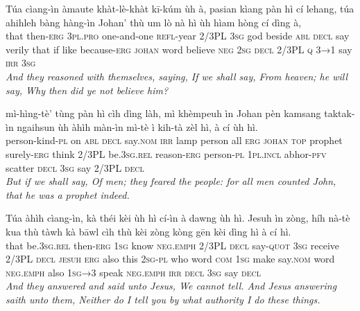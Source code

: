 \documentclass[11pt,a4paper]{article}
\begin{document}
\begin{exe}
\gll Túa cìang-ìn àmaute khàt-lè-khàt kī-kúm ùh à, pasian kìang pàn hì cí lehang, túa ahihleh bàng hàng-ìn Johan' thù um lò nà hì ùh hìam hòng cí dìng à, \\
     that then-\textsc{erg} \textsc{3pl}.\textsc{pro} one-and-one \textsc{refl}-year 2/3PL \textsc{3sg} god beside \textsc{abl} \textsc{decl} say verily that if like because-\textsc{erg} \textsc{johan} word believe \textsc{neg} \textsc{2sg} \textsc{decl} 2/3PL \textsc{q} \textsc{3→1} say \textsc{irr} \textsc{3sg} \\
\glt \textcolor{kjvcolor}{\textit{And they reasoned with themselves, saying, If we shall say, From heaven; he will say, Why then did ye not believe him?}}

\gll mì-hìng-tè' tùng pàn hì cìh dìng làh, mì khèmpeuh ìn Johan pèn kamsang taktak-ìn ngaihsun ùh àhìh màn-ìn mì-tè ì kih-tà zèl hì, à cí ùh hì. \\
     person-kind-\textsc{pl} on \textsc{abl} \textsc{decl} say.\textsc{nom} \textsc{irr} lamp person all \textsc{erg} \textsc{johan} \textsc{top} prophet surely-\textsc{erg} think 2/3PL be.\textsc{3sg}.\textsc{rel} reason-\textsc{erg} person-\textsc{pl} \textsc{1pl}.\textsc{incl} abhor-\textsc{pfv} scatter \textsc{decl} \textsc{3sg} say 2/3PL \textsc{decl} \\
\glt \textcolor{kjvcolor}{\textit{But if we shall say, Of men; they feared the people: for all men counted John, that he was a prophet indeed.}}

\gll Túa àhìh cìang-ìn, kà théi kèi ùh hì cí-ìn à dawng ùh hì. Jesuh ìn zòng, híh nà-tè kua thù tàwh kà bāwl cìh thù kèi zòng kòng gēn kèi dìng hì à cí hì. \\
     that be.\textsc{3sg}.\textsc{rel} then-\textsc{erg} \textsc{1sg} know \textsc{neg}.\textsc{emph} 2/3PL \textsc{decl} say-\textsc{quot} \textsc{3sg} receive 2/3PL \textsc{decl} \textsc{jesuh} \textsc{erg} also this \textsc{2sg}-\textsc{pl} who word \textsc{com} \textsc{1sg} make say.\textsc{nom} word \textsc{neg}.\textsc{emph} also \textsc{1sg→3} speak \textsc{neg}.\textsc{emph} \textsc{irr} \textsc{decl} \textsc{3sg} say \textsc{decl} \\
\glt \textcolor{kjvcolor}{\textit{And they answered and said unto Jesus, We cannot tell. And Jesus answering saith unto them, Neither do I tell you by what authority I do these things.}}

\end{exe}
\newpage
\end{document}

